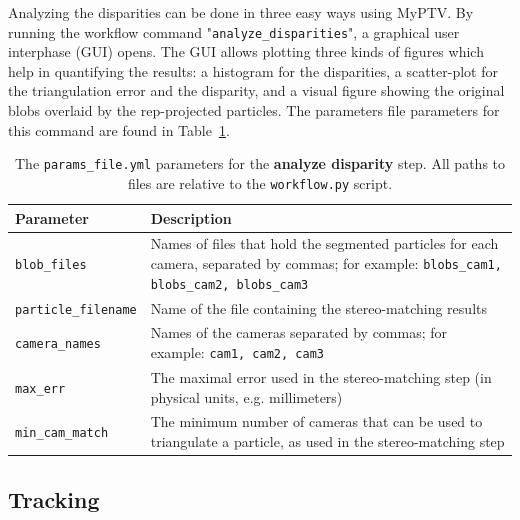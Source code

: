 \documentclass[10pt,a4paper]{article}
\begin{document}
Analyzing the disparities can be done in three easy ways using MyPTV. By running the workflow command "\texttt{analyze\_disparities}", a graphical user interphase (GUI) opens. The GUI allows plotting three kinds of figures which help in quantifying the results: a histogram for the disparities, a scatter-plot for the triangulation error and the disparity, and a visual figure showing the original blobs overlaid by the rep-projected particles. The parameters file parameters for this command are found in Table~\ref{tab:analyze_disparity}. 



\begin{table}[!ht]
	\centering
	\caption{The \texttt{params\_file.yml} parameters for the \textbf{analyze disparity} step. All paths to files are relative to the \texttt{workflow.py} script.}
	\label{tab:analyze_disparity}
	\begin{tabular}{l m{13cm}}
		\hline
		Parameter & Description\\[.1cm]
		\hline
		
		\texttt{blob\_files} & Names of files that hold the segmented particles for each camera, separated by commas; for example: \texttt{blobs\_cam1, blobs\_cam2, blobs\_cam3} \\[.1cm]
		
		\texttt{particle\_filename} & Name of the file containing the  stereo-matching results\\[.1cm]
		
		\texttt{camera\_names} & Names of the cameras separated by commas; for example: \texttt{cam1, cam2, cam3} \\[.1cm]
		
		\texttt{max\_err} & The maximal error used in the stereo-matching step (in physical units, e.g. millimeters) \\[.1cm]
		
		\texttt{min\_cam\_match} & The minimum number of cameras that can be used to triangulate a particle, as used in the stereo-matching step \\[.1cm]
		
		\hline
	\end{tabular}
\end{table}










\subsection{Tracking}\label{sec:workflow_track}
\end{document}
